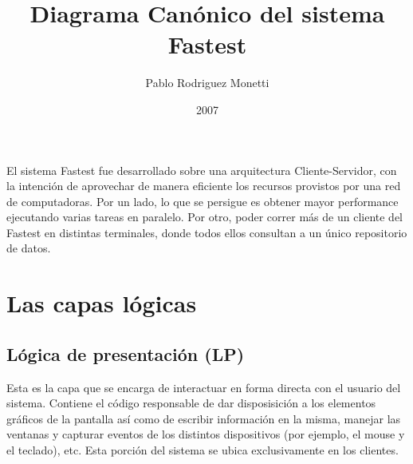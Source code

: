 \documentclass[a4paper,11pt]{article}
\author{Pablo Rodriguez Monetti}
\title{Diagrama Canónico del sistema Fastest}
\date{2007}
\begin{document}
 \maketitle
El sistema Fastest fue desarrollado sobre una arquitectura Cliente-Servidor, con la intención de aprovechar de manera eficiente los recursos provistos por una red de computadoras. Por un lado, lo que se persigue es obtener mayor performance ejecutando varias tareas en paralelo. Por otro, poder correr más de un cliente del Fastest en distintas terminales, donde todos ellos consultan a un único repositorio de datos.

\section{Las capas lógicas}
\subsection{Lógica de presentación (LP)}
Esta es la capa que se encarga de interactuar en forma directa con el usuario del sistema. Contiene el código responsable de dar disposisición a los elementos gráficos de la pantalla así como de escribir información en la misma, manejar las ventanas y capturar eventos de los distintos dispositivos (por ejemplo, el mouse y el teclado), etc. Esta porción del sistema se ubica exclusivamente en los clientes.
\end{document}

